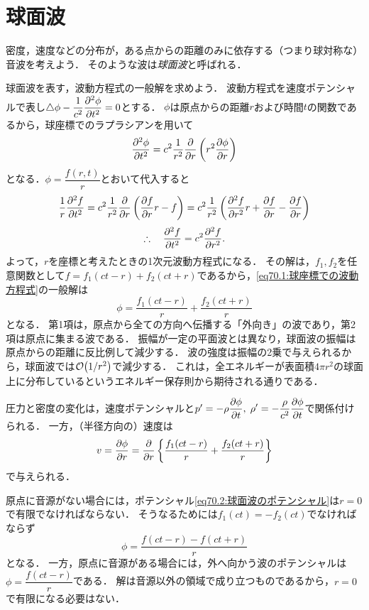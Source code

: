 \section{球面波}

密度，速度などの分布が，ある点からの距離のみに依存する（つまり球対称な）音波を考えよう．
そのような波は\emph{球面波}と呼ばれる．


球面波を表す，波動方程式の一般解を求めよう．
波動方程式を速度ポテンシャルで表し$\Laplacian\phi - \dfrac{1}{c^2}\dpdv[2]{\phi}{t}=0$とする．
$\phi$は原点からの距離$r$および時間$t$の関数であるから，球座標でのラプラシアンを用いて
\begin{equation}\label{eq70.1:球座標での波動方程式}
    \pdv[2]{\phi}{t} = c^2 \frac{1}{r^2} \pdv{r} \left( r^2 \pdv{\phi}{r} \right)
\end{equation}
となる．$\phi = \dfrac{f(r,t)}{r}$とおいて代入すると
\[
    \frac{1}{r} \pdv[2]{f}{t} = c^2 \frac{1}{r^2} \pdv{r} \left( \pdv{f}{r} r - f \right) 
    = c^2 \frac{1}{r^2} \left( \pdv[2]{f}{r} r + \pdv{f}{r} - \pdv{f}{r} \right)
\]
\[
    \therefore\quad \pdv[2]{f}{t} = c^2 \pdv[2]{f}{r}.
\]
よって，$r$を座標と考えたときの1次元波動方程式になる．
その解は，$f_1,f_2$を任意関数として$f=f_1(ct-r)+f_2(ct+r)$であるから，\eqref{eq70.1:球座標での波動方程式}の一般解は
\begin{equation}\label{eq70.2:球面波のポテンシャル}
    \phi = \frac{f_1(ct-r)}{r} + \frac{f_2(ct+r)}{r}
\end{equation}
となる．
第1項は，原点から全ての方向へ伝播する「外向き」の波であり，第2項は原点に集まる波である．
振幅が一定の平面波とは異なり，球面波の振幅は原点からの距離に反比例して減少する．
波の強度は振幅の2乗で与えられるから，球面波では$\order{1/r^2}$で減少する．
これは，全エネルギーが表面積$4\pi r^2$の球面上に分布しているというエネルギー保存則から期待される通りである．


圧力と密度の変化は，速度ポテンシャルと$p'=-\rho\dpdv{\phi}{t}, \; \rho'=-\dfrac{\rho}{c^2}\dpdv{\phi}{t}$で関係付けられる．
一方，（半径方向の）速度は
\begin{equation}
    v = \pdv{\phi}{r} = \pdv{r} \left\{ \frac{f_1(ct-r)}{r} + \frac{f_2(ct+r)}{r} \right\}
\end{equation}
で与えられる．


原点に音源がない場合には，ポテンシャル\eqref{eq70.2:球面波のポテンシャル}は$r=0$で有限でなければならない．
そうなるためには$f_1(ct)=-f_2(ct)$でなければならず
\begin{equation}\label{eq70.4:原点に音源がない球面波のポテンシャル}
    \phi = \frac{f(ct-r) - f(ct+r)}{r}
\end{equation}
となる．
一方，原点に音源がある場合には，外へ向かう波のポテンシャルは$\phi = \dfrac{f(ct-r)}{r}$である．
解は音源以外の領域で成り立つものであるから，$r=0$で有限になる必要はない．


